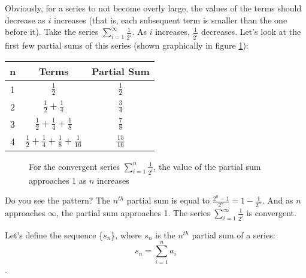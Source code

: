 Obviously, for a series to not become overly large, the values of the terms 
should decrease as $i$ increases (that is, each subsequent term is 
smaller than the one before it). Take the series $\sum_{i=1}^\infty 
\frac{1}{2^i}$. As $i$ increases, $\frac{1}{2^i}$ decreases. Let's 
look at the first few partial sums of this series (shown graphically 
in figure \ref{fig:convsum}):
\begin{center}
\begin{tabular}{|c|c|c|}\hline
n & Terms & Partial Sum\\
\hline
1 & $\frac{1}{2}$ & $\frac{1}{2}$\\
\hline
2 & $\frac{1}{2} + \frac{1}{4}$ & $\frac{3}{4}$\\
\hline
3 & $\frac{1}{2} + \frac{1}{4} + \frac{1}{8}$ & $\frac{7}{8}$\\
\hline
4 & $\frac{1}{2} + \frac{1}{4} + \frac{1}{8} + \frac{1}{16}$ & 
$\frac{15}{16}$\\
\hline
\end{tabular}
\end{center}

\begin{figure}[htbp]
\centering
    \caption{For the convergent series $\sum_{i=1}^n \frac{1}{2^i}$, 
    the value of the partial sum approaches 1 as $n$ increases}
    \label{fig:convsum}
\end{figure}

Do you see the pattern? The $n^{th}$ partial sum is equal to 
$\frac{2^n - 1}{2^n} = 1 - \frac{1}{2^n}$. And as $n$ approaches 
$\infty$, the partial sum approaches 1. The series $\sum_{i=1}^\infty 
\frac{1}{2^i}$ is convergent. 

Let's define the sequence \{$s_n$\}, where $s_n$ is the $n^{th}$ 
partial sum of a series:
$$s_n = \sum_{i=1}^n a_i$$. 

